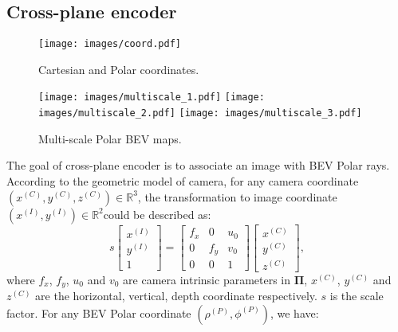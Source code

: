 \documentclass[letterpaper]{article} \usepackage{aaai23}  \usepackage{times}  \usepackage{helvet}  \usepackage{courier}  \usepackage[hyphens]{url}  \usepackage{graphicx} \urlstyle{rm} \def\UrlFont{\rm}  \usepackage{natbib}  \usepackage{caption} \frenchspacing  \setlength{\pdfpagewidth}{8.5in} \setlength{\pdfpageheight}{11in} \usepackage{algorithm}
\begin{document}
\subsection{Cross-plane encoder}
\begin{figure*}[t]
\centering
\begin{minipage}[t]{0.445\textwidth}
\centering
\texttt{[image: images/coord.pdf]}
\caption{Cartesian and Polar coordinates.}
\label{fig:learning_targets}
\end{minipage}
\begin{minipage}[t]{0.545\textwidth}
\centering
\texttt{[image: images/multiscale\_1.pdf]}
\hspace{-0.75cm}
\texttt{[image: images/multiscale\_2.pdf]} 
\hspace{-0.15cm}
\texttt{[image: images/multiscale\_3.pdf]}
\caption{Multi-scale Polar BEV maps.}
\label{fig:multi-scale}
\end{minipage}
\end{figure*}
 The goal of cross-plane encoder is to associate an image with BEV Polar rays. According to the geometric model of camera, for any camera coordinate $ (x^{(C)}, y^{(C)}, z^{(C)})\in \mathbb{R}^3$, the transformation to image coordinate $ (x^{(I)}, y^{(I)})\in \mathbb{R}^2$could be described as:
\begin{equation}\label{eq:cam2img}
    s\begin{bmatrix}
    x^{(I)}\\
    y^{(I)}\\
    1
    \end{bmatrix} =
    \begin{bmatrix}
    f_x & 0 & u_0 \\
    0 & f_y & v_0 \\
    0 & 0 & 1
    \end{bmatrix}
    \begin{bmatrix}
    x^{(C)} \\
    y^{(C)} \\
    z^{(C)} 
    \end{bmatrix},
\end{equation}
where $f_x$, $f_y$, $u_0$ and $v_0$ are camera intrinsic parameters in $\mathbf{\Pi}$, $x^{(C)}$, $y^{(C)}$ and $z^{(C)}$ are the horizontal, vertical, depth coordinate respectively. $s$ is the scale factor. For any BEV Polar coordinate $(\rho^{(P)}, \phi^{(P)})$, we have:
\end{document}

